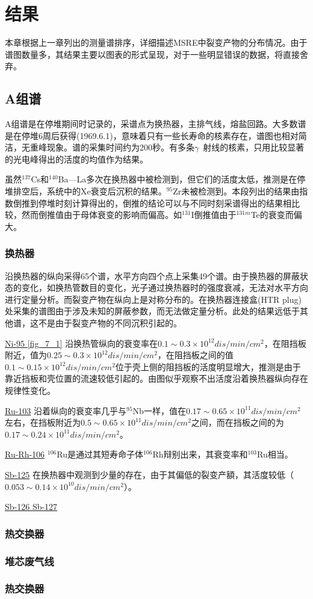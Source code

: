 \chapter{结果}

本章根据上一章列出的测量谱排序，详细描述MSRE中裂变产物的分布情况。由于谱图数量多，其结果主要以图表的形式呈现，对于一些明显错误的数据，将直接舍弃。

\section{A组谱}

A组谱是在停堆期间时记录的，采谱点为换热器，主排气线，熔盐回路。大多数谱是在停堆6周后获得(1969.6.1)，意味着只有一些长寿命的核素存在，谱图也相对简洁，无重峰现象。谱的采集时间约为200秒。有多条$\gamma$\ 射线的核素，只用比较显著的光电峰得出的活度的均值作为结果。

虽然$^{137}$Cs和$^{140}$Ba—La多次在换热器中被检测到，但它们的活度太低，推测是在停堆排空后，系统中的Xe衰变后沉积的结果。$^{95}$Zr未被检测到。本段列出的结果由指数倒推到停堆时刻计算得出的，倒推的结论可以与不同时刻采谱得出的结果相比较，然而倒推值由于母体衰变的影响而偏高。如$^{131}$I倒推值由于$^{131m}$Te的衰变而偏大。

\subsection{换热器}

沿换热器的纵向采得65个谱，水平方向四个点上采集49个谱。由于换热器的屏蔽状态的变化，如换热管数目的变化，光子通过换热器时的强度衰减，无法对水平方向进行定量分析。而裂变产物在纵向上是对称分布的。在换热器连接盒(HTR plug)处采集的谱图由于涉及未知的屏蔽参数，而无法做定量分析。此处的结果远低于其他谱，这不是由于裂变产物的不同沉积引起的。

\underline{Ni-95 \ref{fig_7_1}} 沿换热管纵向的衰变率在$0.1\sim 0.3\times 10^{12}dis/min/cm^2$，在阻挡板附近，值为$0.25\sim 0.3\times 10^{12}dis/min/cm^2$，在阻挡板之间的值$0.1\sim 0.15\times 10^{12}dis/min/cm^2$位于壳上侧的阻挡板的活度明显增大，推测是由于靠近挡板和壳位置的流速较低引起的。由图似乎观察不出活度沿着换热器纵向存在规律性变化。

\underline{Ru-103} 沿着纵向的衰变率几乎与$^{95}$Nb一样，值在$0.17\sim 0.65\times 10^{11}dis/min/cm^2$左右，在挡板附近为$0.5\sim 0.65\times 10^{11}dis/min/cm^2$之间，而在挡板之间的为$0.17\sim 0.24\times 10^{11}dis/min/cm^2$。

\underline{Ru-Rh-106} $^{106}$Ru是通过其短寿命子体$^{106}$Rh辩别出来，其衰变率和$^{103}$Ru相当。

\underline{Sb-125} 在换热器中观测到少量的存在，由于其偏低的裂变产額，其活度较低（$0.053\sim 0.14\times 10^{10}dis/min/cm^2$）。

\underline{Sb-126 Sb-127}

\subsection{热交换器}

\subsection{堆芯废气线}

\subsection{热交换器}
